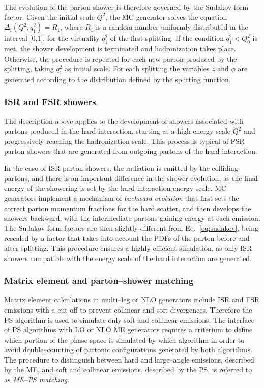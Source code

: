 The evolution of the parton shower is therefore governed by the
Sudakov form factor. Given the initial scale $Q^2$, the MC generator solves
the equation $\Delta_i(Q^2, q_1^2)=R_1$, where $R_1$ is a random
number uniformly distributed in the interval [0,1], for the virtuality $q_1^2$ of
the first splitting. If the condition $q_1^2<Q_0^2$ is met, the shower
development is terminated and hadronization takes place. Otherwise,
the procedure is repeated for each new parton produced by the
splitting, taking $q_1^2$ as initial scale.
For each splitting the variables $z$ and $\phi$ are generated
according to the distribution defined by the splitting function.

\subsubsection{ISR and FSR showers}
\label{sec:isrfsr}

The description above applies to the development of showers
associated with partons produced in the hard interaction, starting at
a high energy scale $Q^2$ and progressively reaching the hadronization
scale. This process is typical of FSR parton showers that are
generated from outgoing partons of the hard interaction.

In the case of ISR parton showers, the radiation is emitted by the
colliding partons, and there is an important difference in the shower
evolution, as the final energy of the showering is set by the hard
interaction energy scale.
MC generators implement a mechanism of {\it backward evolution} that
first sets the correct parton momentum fractions for the hard scatter,
and then develops the showers backward, with the intermediate partons
gaining energy at each emission. The Sudakov form factors are then
slightly different from Eq.~\ref{eq:sudakov}, being rescaled by a
factor that takes into account the PDFs of the parton before and after
splitting. This procedure ensures a highly efficient simulation, as
only ISR showers compatible with the energy scale of the hard
interaction are generated. 

\subsubsection{Matrix element and parton--shower matching}
\label{sec:matching}
 
Matrix element calculations in multi--leg or NLO generators include
ISR and FSR emissions with a cut-off to prevent collinear
and soft divergences. Therefore the PS algorithm is used to simulate
only soft and collinear emissions.
The interface of PS algorithms with LO or NLO ME generators requires a
criterium to define which portion of the phase space is simulated by
which algorithm in order to avoid double--counting of partonic
configurations generated by both algorithms. The procedure to
distinguish between hard and large--angle emissions, described by the
ME, and soft and collinear emissions, described by the PS, is referred
to as {\it ME--PS matching}. 

